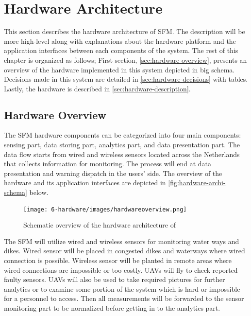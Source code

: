 \chapter{Hardware Architecture}
\label{ch:hardware}
This section describes the hardware architecture of SFM. The description will be more high-level along with explanations about the hardware platform and the application interfaces between each components of the system. The rest of this chapter is organized as follows; First section, \autoref{sec:hardware-overview}, presents an overview of the hardware implemented in this system depicted in big schema. Decisions made in this system are detailed in \autoref{sec:hardware-decisions} with tables. Lastly, the hardware is described in \autoref{sec:hardware-description}.

\section{Hardware Overview}
\label{sec:hardware-overview}
The SFM hardware components can be categorized into four main components: sensing part, data storing part, analytics part, and data presentation part. The data flow starts from wired and wireless sensors located across the Netherlands that collects information for monitoring. The process will end at data presentation and warning dispatch in the users' side. The overview of the hardware and its application interfaces are depicted in \autoref{fig:hardware-archi-schema} below.

\begin{figure}[hb!]
\centering
\texttt{[image: 6-hardware/images/hardwareoverview.png]}
\caption{Schematic overview of the hardware architecture of \ProjectName{}}
\label{fig:hardware-archi-schema}
\end{figure}

The SFM will utilize wired and wireless sensors for monitoring water ways and dikes. Wired sensor will be placed in congested dikes and waterways where wired connection is possible. Wireless sensor will be planted in remote areas where wired connections are impossible or too costly. UAVs will fly to check reported faulty sensors. UAVs will also be used to take required pictures for further analytics or to examine some portion of the system which is hard or impossible for a personnel to access. Then all measurements will be forwarded to the sensor monitoring part to be normalized before getting in to the analytics part.

